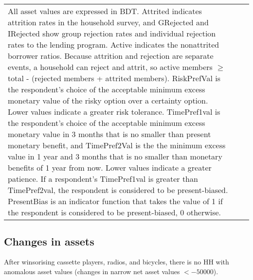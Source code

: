\begin{minipage}[t]{14cm}
\begin{tabular}{>{\hfill\scriptsize}p{1cm}<{}>{\hfill\scriptsize}p{.25cm}<{}>{\scriptsize}p{12cm}<{\hfill}}
All asset values are expressed in BDT. \textsf{Attrited} indicates attrition rates in the household survey, and \textsf{GRejected} and \textsf{IRejected} show group rejection rates and individual rejection rates to the lending program. \textsf{Active} indicates the nonattrited borrower ratios. Because attrition and rejection are separate events, a household can reject and attrit, so active members $\geqslant$ total - (rejected members + attrited members). \textsf{RiskPrefVal} is the respondent's choice of the acceptable minimum excess monetary value of the risky option over a certainty option. Lower values indicate a greater risk tolerance. \textsf{TimePref1val} is the respondent's choice of the acceptable minimum excess monetary value in 3 months that is no smaller than present monetary benefit, and \textsf{TimePref2Val} is the the minimum excess value in 1 year and 3 months that is no smaller than monetary benefits of 1 year from now. Lower values indicate a greater patience. If a respondent's \textsf{TimePref1val} is greater than \textsf{TimePref2val}, the respondent is considered to be present-biased. \textsf{PresentBias} is an indicator function that takes the value of 1 if the respondent is considered to be present-biased, 0 otherwise.
\end{tabular}
\end{minipage}



\subsection{Changes in assets}


After winsorising cassette players, radios, and bicycles, there is no HH with anomalous asset values (changes in narrow net asset values $<-50000$).



